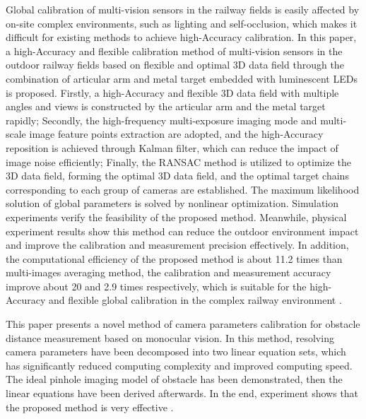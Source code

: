 Global calibration of multi-vision sensors in the railway fields is easily affected by on-site complex environments, such as lighting and self-occlusion, which makes it difficult for existing methods to achieve high-Accuracy calibration. In this paper, a high-Accuracy and flexible calibration method of multi-vision sensors in the outdoor railway fields based on flexible and optimal 3D data field through the combination of articular arm and metal target embedded with luminescent LEDs is proposed. Firstly, a high-Accuracy and flexible 3D data field with multiple angles and views is constructed by the articular arm and the metal target rapidly; Secondly, the high-frequency multi-exposure imaging mode and multi-scale image feature points extraction are adopted, and the high-Accuracy reposition is achieved through Kalman filter, which can reduce the impact of image noise efficiently; Finally, the RANSAC method is utilized to optimize the 3D data field, forming the optimal 3D data field, and the optimal target chains corresponding to each group of cameras are established. The maximum likelihood solution of global parameters is solved by nonlinear optimization. Simulation experiments verify the feasibility of the proposed method. Meanwhile, physical experiment results show this method can reduce the outdoor environment impact and improve the calibration and measurement precision effectively. In addition, the computational efficiency of the proposed method is about 11.2 times than multi-images averaging method, the calibration and measurement accuracy improve about 20 and 2.9 times respectively, which is suitable for the high-Accuracy and flexible global calibration in the complex railway environment \cite{Pan2019}.

This paper presents a novel method of camera parameters calibration for obstacle distance measurement based on monocular vision. In this method, resolving camera parameters have been decomposed into two linear equation sets, which has significantly reduced computing complexity and improved computing speed. The ideal pinhole imaging model of obstacle has been demonstrated, then the linear equations have been derived afterwards. In the end, experiment shows that the proposed method is very effective \cite{Lin2014}.

